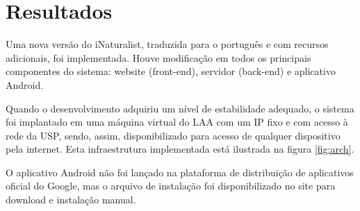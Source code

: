 \section{Resultados}
Uma nova versão do iNaturalist, traduzida para o português e com recursos adicionais, foi implementada. Houve modificação em todos os principais componentes do sistema: website (front-end), servidor (back-end) e aplicativo Android.

Quando o desenvolvimento adquiriu um nível de estabilidade adequado, o sistema foi implantado em uma máquina virtual do LAA com um IP fixo e com acesso à rede da USP, sendo, assim, disponibilizado para acesso de qualquer dispositivo pela internet. Esta infraestrutura implementada está ilustrada na figura \ref{fig:arch}.

O aplicativo Android não foi lançado na plataforma de distribuição de aplicativos oficial do Google, mas o arquivo de instalação foi disponibilizado no site para download e instalação manual.
